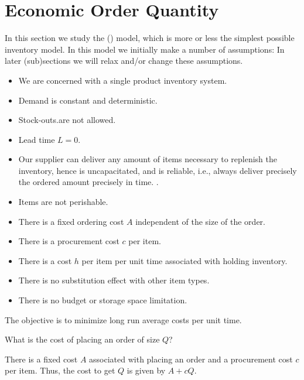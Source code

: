 \section{Economic Order Quantity}
\label{sec:deterministic}



In this section we study the  () model, which is more or less the simplest possible inventory model. In this model we initially make a number of  assumptions: In later (sub)sections we will relax and/or change these assumptions.

\begin{itemize}
\item We are concerned with a single product inventory system.
\item Demand is constant and deterministic.
\item Stock-outs.are not allowed.
\item Lead time $L=0$.
\item Our supplier can deliver any amount of items necessary to replenish the inventory, hence is uncapacitated,  and is reliable, i.e., always deliver precisely the ordered amount precisely in time. . 
\item Items are not perishable.
\item There is a fixed ordering cost $A$ independent of the size of the order.
\item There is a procurement cost $c$ per item.
\item There is a cost $h$ per item per unit time associated with holding inventory.
\item There is no substitution effect with other item types.
\item There is no budget or storage space limitation.
\end{itemize}

The objective is to minimize long run average costs per unit time. 

\begin{exercise}
  What is the cost of placing an order of size $Q$?
  \begin{solution}
 There is a fixed cost $A$ associated with placing an order and a procurement cost $c$  per item. Thus,  the cost to get $Q$ is given by $A+c Q$.
  \end{solution}
\end{exercise}


